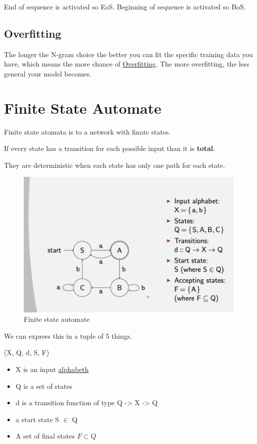\documentclass[
  11pt,
  british,
]{article}
\providecommand{\tightlist}{%
  \setlength{\itemsep}{0pt}\setlength{\parskip}{0pt}}
\begin{document}
End of sequence is activated so EoS. Beginning of sequence is activated
so BoS.

\hypertarget{overfitting-1}{%
\subsection{Overfitting}\label{overfitting-1}}

The longer the N-gram choice the better you can fit the specific
training data you have, which means the more chance of
\href{../Prediction/Overfitting.md}{Overfitting}. The more overfitting,
the less general your model becomes.

\hypertarget{finite-state-automate}{%
\section{Finite State Automate}\label{finite-state-automate}}

Finite state atomata is to a network with finate states.

If every state has a transition for each possible input than it is
\textbf{total}.

They are deterministic when each state has only one path for each state.

\begin{figure}
\centering
\includegraphics{Pasted_image_20211212163706.png}
\caption{Finite state automate}
\end{figure}

We can express this in a tuple of 5 things.

(X, Q, d, S, F)

\begin{itemize}
\tightlist
\item
  X is an input \href{Alphabet.md}{alphabeth}
\item
  Q is a set of states
\item
  d is a transition function of type Q -\textgreater{} X -\textgreater{}
  Q
\item
  a start state S \(\in\) Q
\item
  A set of final states \(F \subset Q\)
\end{itemize}
\end{document}
